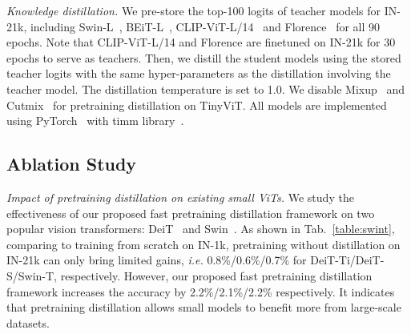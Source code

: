 \documentclass[runningheads]{llncs}
\newcommand\REV[1]{#1}
\begin{document}
\textit{Knowledge distillation.} We pre-store the top-100 logits of teacher models for IN-21k, including Swin-L~\cite{swin}, BEiT-L~\cite{BEiT}, CLIP-ViT-L/14~\cite{clip,ViT} and Florence~\cite{florence} for all 90 epochs. Note that CLIP-ViT-L/14 and Florence are finetuned on IN-21k for 30 epochs to serve as teachers. Then, we distill the student models using the stored teacher logits with the same hyper-parameters as the distillation involving the teacher model. The distillation temperature is set to 1.0. We disable Mixup~\cite{mixup} and Cutmix~\cite{cutmix} for pretraining distillation on TinyViT.
All models are implemented using PyTorch~\cite{pytorch} with timm library~\cite{timm}.

\vspace{-3mm}
\subsection{Ablation Study}
\label{sec:ablation}

\begin{table}[t]
\begin{center}
\caption{Ablation study on different pretraining strategies for Swin~\cite{swin} and DeiT~\cite{deit}. The performance on IN-1k is reported.
}
\label{table:swint}
\end{center}
\vspace{-5mm}
\end{table}

\textit{Impact of pretraining distillation on existing small ViTs.} We study the effectiveness of our proposed fast pretraining distillation framework on two popular vision transformers: DeiT~\cite{deit} and Swin~\cite{swin}. As shown in Tab.~\ref{table:swint}, comparing to training from scratch on IN-1k, pretraining without distillation on IN-21k can only bring limited gains, \emph{i.e.} 0.8\%/0.6\%/0.7\% for DeiT-Ti/DeiT-S/Swin-T, respectively. However, our proposed fast pretraining distillation framework increases the accuracy by 2.2\%/2.1\%/2.2\% respectively.
\REV{It indicates that pretraining distillation allows small models to benefit more from large-scale datasets. }
\end{document}
